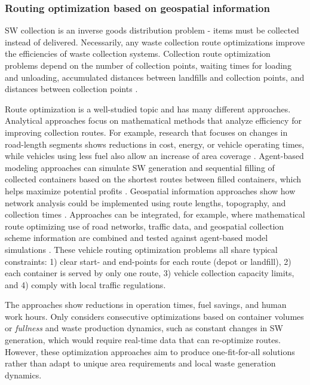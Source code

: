 \documentclass[authoryear,preprint,review,11pt,doubleblind]{elsarticle}
\begin{document}
\subsubsection{Routing optimization based on geospatial information}
    \label{subsubsec:routing}
    SW collection is an inverse goods distribution problem - items must be collected instead of delivered. Necessarily, any waste collection route optimizations improve the efficiencies of waste collection systems. Collection route optimization problems depend on the number of collection points, waiting times for loading and unloading, accumulated distances between landfills and collection points, and distances between collection points \citep{Sarmah2019}.

 Route optimization is a well-studied topic and has many different approaches. Analytical approaches focus on mathematical methods that analyze efficiency for improving collection routes. For example, research that focuses on changes in road-length segments shows reductions in cost, energy, or vehicle operating times, while vehicles using less fuel also allow an increase of area coverage \citep{erdincRouteOptimizationElectric2019, Hannan2018, Sahib2021}. Agent-based modeling approaches can simulate SW generation and sequential filling of collected containers based on the shortest routes between filled containers, which helps maximize potential profits \citep{Likotiko2017}. Geospatial information approaches show how network analysis could be implemented using route lengths, topography, and collection times \citep{Hemidat2017, Jovicic2010, Malakahmad2014}. Approaches can be integrated, for example, where mathematical route optimizing use of road networks, traffic data, and geospatial collection scheme information are combined and tested against agent-based model simulations \citep{nguyen-trongOptimizationMunicipalSolid2017}. These vehicle routing optimization problems all share typical constraints: 1) clear start- and end-points for each route (depot or landfill), 2) each container is served by only one route, 3) vehicle collection capacity limits, and 4)  comply with local traffic regulations.

    The approaches show reductions in operation times, fuel savings, and human work hours. Only \citet{Likotiko2017} considers consecutive optimizations based on container volumes or \textit{fullness} and waste production dynamics, such as constant changes in SW generation, which would require real-time data that can re-optimize routes. However, these optimization approaches aim to produce one-fit-for-all solutions rather than adapt to unique area requirements and local waste generation dynamics.
\end{document}
